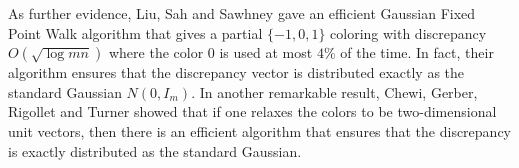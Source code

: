     As further evidence, Liu, Sah and Sawhney \cite{LiuSS22} gave an efficient  Gaussian Fixed Point Walk algorithm that gives a partial $\{-1,0,1\}$ coloring with discrepancy $O(\sqrt{\log mn})$ where the color $0$ is used at most $4\%$ of the time.
    In fact, their algorithm ensures that the discrepancy vector is distributed exactly 
   as the standard Gaussian $N(0,I_m)$.  
    In another remarkable result, Chewi, Gerber, Rigollet and Turner \cite{ChewiGRT22} showed  that if one relaxes the colors to be two-dimensional unit vectors, then there is an efficient algorithm that ensures that the discrepancy is exactly distributed as the standard Gaussian.

